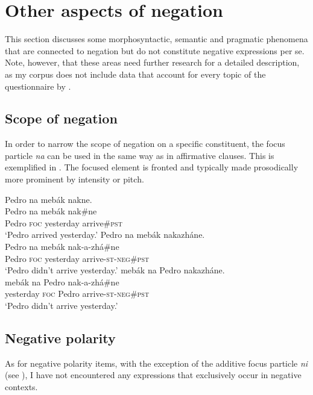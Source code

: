 \documentclass[output=paper,colorlinks,citecolor=brown]{langscibook}
\begin{document}
\section{Other aspects of negation}\label{sec:kog:4}

This section  discusses some morphosyntactic, semantic and pragmatic phenomena that are connected to negation but do not constitute negative expressions per se. Note, however, that these areas need further research for a detailed description, as my corpus does not include data that account for every topic of the questionnaire by .

\subsection{Scope of negation}\label{sec:kog:4.1}

In order to narrow the scope of negation on a specific constituent, the focus particle \textit{na} can be used in the same way as in affirmative clauses. This is exemplified in . The focused element is fronted and typically made prosodically more prominent by intensity or pitch.

 \ea\label{ex:kog:64}
    \ea\label{ex:kog:64a}Pedro na mebák nakne.\\
        \gll  Pedro na mebák nak\#ne\\ 
              Pedro \textsc{foc} yesterday arrive\#\textsc{pst}\\
        \glt ‘Pedro arrived yesterday.’
    \ex\label{ex:kog:64b} Pedro na mebák nakazháne.\\
        \gll  Pedro na mebák nak-a{}-zhá\#ne\\
              Pedro \textsc{foc} yesterday arrive{}-\textsc{st-neg}\#\textsc{pst}\\
        \glt‘Pedro didn’t arrive yesterday.’
    \ex\label{ex:kog:64c}mebák na Pedro nakazháne.\\
        \gll  mebák na Pedro nak-a{}-zhá\#ne\\
              yesterday \textsc{foc} Pedro arrive-\textsc{st-neg}\#\textsc{pst}\\
        \glt  ‘Pedro didn’t arrive yesterday.’
    \z
\z 

\subsection{Negative polarity}\label{sec:kog:4.2}

As for negative polarity items, with the exception of the additive focus particle \textit{ni} (see ), I have not encountered any expressions
that exclusively occur in negative contexts.
\end{document}
